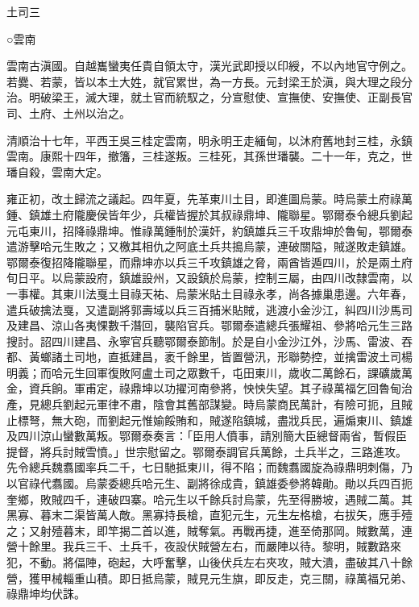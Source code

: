 
\begin{pinyinscope}
土司三

○雲南

雲南古滇國。自越巂蠻夷任貴自領太守，漢光武即授以印綬，不以內地官守例之。若爨、若蒙，皆以本土大姓，就官累世，為一方長。元封梁王於滇，與大理之段分治。明破梁王，滅大理，就土官而統馭之，分宣慰使、宣撫使、安撫使、正副長官司、土府、土州以治之。

清順治十七年，平西王吳三桂定雲南，明永明王走緬甸，以沐府舊地封三桂，永鎮雲南。康熙十四年，撤籓，三桂遂叛。三桂死，其孫世璠襲。二十一年，克之，世璠自殺，雲南大定。

雍正初，改土歸流之議起。四年夏，先革東川土目，即進圖烏蒙。時烏蒙土府祿萬鍾、鎮雄土府隴慶侯皆年少，兵權皆握於其叔祿鼎坤、隴聯星。鄂爾泰令總兵劉起元屯東川，招降祿鼎坤。惟祿萬鍾制於漢奸，約鎮雄兵三千攻鼎坤於魯甸，鄂爾泰遣游擊哈元生敗之；又檄其相仇之阿底土兵共搗烏蒙，連破關隘，賊遂敗走鎮雄。鄂爾泰復招降隴聯星，而鼎坤亦以兵三千攻鎮雄之脅，兩酋皆遁四川，於是兩土府旬日平。以烏蒙設府，鎮雄設州，又設鎮於烏蒙，控制三屬，由四川改隸雲南，以一事權。其東川法戛土目祿天祐、烏蒙米貼土目祿永孝，尚各據巢患邊。六年春，遣兵破擒法戛，又遣副將郭壽域以兵三百捕米貼賊，逃渡小金沙江，糾四川沙馬司及建昌、涼山各夷惈數千潛回，襲陷官兵。鄂爾泰遣總兵張耀祖、參將哈元生三路搜討。詔四川建昌、永寧官兵聽鄂爾泰節制。於是自小金沙江外，沙馬、雷波、吞都、黃螂諸土司地，直抵建昌，袤千餘里，皆置營汛，形聯勢控，並擒雷波土司楊明義；而哈元生回軍復敗阿盧土司之眾數千，屯田東川，歲收二萬餘石，課礦歲萬金，資兵餉。軍甫定，祿鼎坤以功擢河南參將，怏怏失望。其子祿萬福乞回魯甸治產，見總兵劉起元軍律不肅，陰會其舊部謀變。時烏蒙商民萬計，有險可扼，且賊止標弩，無大砲，而劉起元惟媮餒賄和，賊遂陷鎮城，盡戕兵民，遍煽東川、鎮雄及四川涼山蠻數萬叛。鄂爾泰奏言：「臣用人僨事，請別簡大臣總督兩省，暫假臣提督，將兵討賊雪憤。」世宗慰留之。鄂爾泰調官兵萬餘，土兵半之，三路進攻。先令總兵魏翥國率兵二千，七日馳抵東川，得不陷；而魏翥國旋為祿鼎明刺傷，乃以官祿代翥國。烏蒙委總兵哈元生、副將徐成貴，鎮雄委參將韓勛。勛以兵四百扼奎鄉，敗賊四千，連破四寨。哈元生以千餘兵討烏蒙，先至得勝坡，遇賊二萬。其黑寡、暮末二渠皆萬人敵。黑寡持長槍，直犯元生，元生左格槍，右拔矢，應手殪之；又射殪暮末，即竿揭二首以進，賊奪氣。再戰再捷，進至倚那岡。賊數萬，連營十餘里。我兵三千、土兵千，夜設伏賊營左右，而嚴陣以待。黎明，賊數路來犯，不動。將偪陣，砲起，大呼奮擊，山後伏兵左右夾攻，賊大潰，盡破其八十餘營，獲甲械輜重山積。即日抵烏蒙，賊見元生旗，即反走，克三關，祿萬福兄弟、祿鼎坤均伏誅。


\end{pinyinscope}
